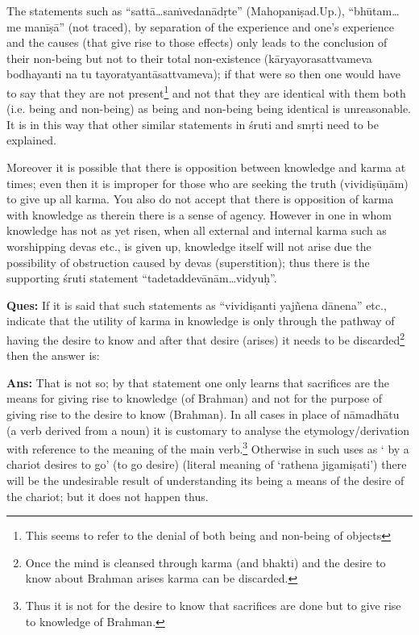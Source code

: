\vskip -2pt

The statements such as “sattā…saṁvedanādṛte” (Mahopaniṣad.Up.), “bhūtam…me manīṣā” (not traced), by separation of the experience and one’s experience and the causes (that give rise to those effects) only leads to the conclusion of their non-being but not to their total non-existence (kāryayorasattvameva bodhayanti na tu tayoratyantāsattvameva); if that were so then one would have to say that they are not present\footnote{This seems to refer to the denial of both being and non-being of objects} and not that they are identical with them both (i.e. being and non-being) as being and non-being being identical is unreasonable. It is in this way that other similar statements in śruti and smṛti need to be explained.

\vskip -2pt

Moreover it is possible that there is opposition between knowledge and karma at times; even then it is improper for those who are seeking the truth (vividiṣūṇām) to give up all karma. You also do not accept that there is opposition of karma with knowledge as therein there is a sense of agency. However in one in whom knowledge has not as yet risen, when all external and internal karma  such as worshipping devas etc., is given up, knowledge itself will not arise due the possibility of obstruction caused by devas (superstition); thus there is the supporting  śruti statement “tadetaddevānām…vidyuḥ”.

\vskip -2pt

\textbf{Ques:} If it is said that such statements as “vividiṣanti yajñena dānena” etc., indicate that the utility of karma in knowledge is only through the pathway of having the desire to know and after that desire (arises) it needs to be discarded\footnote{Once the mind is cleansed through karma (and bhakti) and the desire to know about Brahman arises karma can be discarded.} then the answer is:

\vskip -2pt

\textbf{Ans:} That is not so; by that statement one only learns that sacrifices are the means for giving rise to knowledge (of Brahman) and not for the purpose of giving rise to the desire to know (Brahman). In all cases in place of nāmadhātu (a verb derived from a noun) it is customary to analyse the etymology/derivation with reference to the meaning of the main verb.\footnote{Thus it is not for the desire to know that sacrifices are done but to give rise to knowledge of Brahman.} Otherwise in such uses as ‘ by a chariot desires to go’ (to go desire) (literal meaning of ‘rathena jigamiṣati’) there will be the undesirable result of understanding its being  a means of the desire of the chariot; but it does not happen thus.

